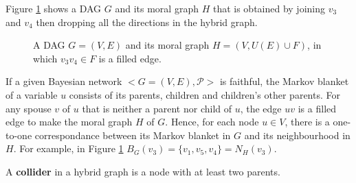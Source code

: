 \begin{example}
Figure \ref{fg:envelope} shows a DAG $G$ and its moral graph $H$ that is obtained by joining $v_3$ and $v_4$ then dropping all the directions in the hybrid graph. 
\label{ex:moral_graph}
\begin{figure}[H]
\centering
{}
\caption{A DAG $G=(V,E)$ and its moral graph $H=(V,U(E)\cup F)$, in which $v_3v_4 \in F$ is a filled edge.}
\label{fg:envelope}
\end{figure}
\end{example}

If a given Bayesian network $<G=(V,E),\mathcal{P}>$ is faithful, the Markov blanket of a variable $u$ consists of its parents, children and children's other parents. For any spouse $v$ of $u$ that is neither a parent nor child of $u$, the edge $uv$ is a filled edge to make the moral graph $H$ of $G$. Hence, for each node $u \in V$, there is a one-to-one correspondance between its Markov blanket in $G$ and its neighbourhood in $H$. For example, in Figure \ref{fg:envelope} $B_G(v_3)=\{v_1,v_5,v_4\}=N_H(v_3)$.
\begin{definition}
\label{def:collider}
A \textbf{collider} in a hybrid graph is a node with at least two parents. 
\end{definition}

